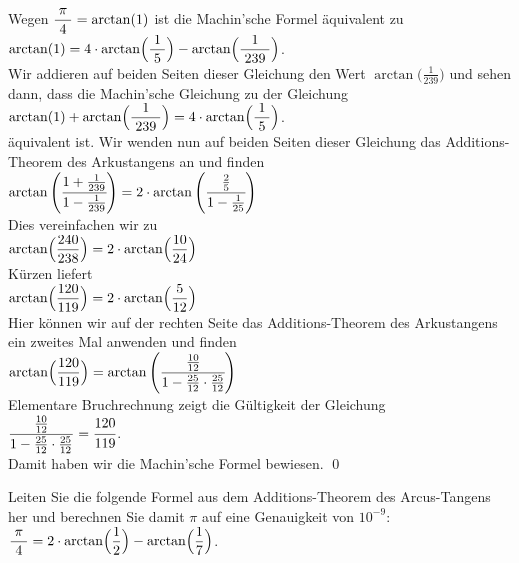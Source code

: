 \proof
Wegen $\displaystyle\frac{\;\displaystyle\pi\;}{\;\displaystyle4\;}= \arctan(1)$ ist die Machin'sche Formel \"aquivalent zu
\\[0.2cm]
\hspace*{1.3cm}
$\arctan(1) = 4 \cdot \arctan\Bigl(\displaystyle\frac{\;\displaystyle1\;}{\;\displaystyle5\;}\Bigr) - \arctan\Bigl(\displaystyle\frac{\;\displaystyle1\;}{\;\displaystyle239\;}\Bigr)$.
\\[0.2cm]
Wir addieren auf beiden Seiten dieser Gleichung den Wert $\arctan\bigl(\frac{1}{239}\bigr)$ und
sehen dann, dass die Machin'sche Gleichung zu der Gleichung
\\[0.2cm]
\hspace*{1.3cm}
$\arctan(1)+ \arctan\Bigl(\displaystyle\frac{\;\displaystyle1\;}{\;\displaystyle239\;}\Bigr) = 4 \cdot \arctan\Bigl(\displaystyle\frac{\;\displaystyle1\;}{\;\displaystyle5\;}\Bigr)$.
\\[0.2cm]
\"aquivalent ist.  Wir wenden nun auf beiden Seiten dieser Gleichung das Additions-Theorem des
Arkustangens an und finden
\\[0.2cm]
\hspace*{1.3cm}
$\arctan\left(\cfrac{1 + \frac{1}{239}}{1 - \frac{1}{239}}\right) = 
 2 \cdot \arctan\left(\cfrac{\frac{2}{5}}{1 - \frac{1}{25}}\right)
$
\\[0.2cm]
Dies vereinfachen wir zu
\\[0.2cm]
\hspace*{1.3cm}
$\displaystyle\arctan\Bigl(\frac{240}{238}\Bigr) =  2 \cdot \arctan\Bigl(\frac{10}{24}\Bigr)$
\\[0.2cm]
K\"urzen liefert
\\[0.2cm]
\hspace*{1.3cm}
$\displaystyle\arctan\Bigl(\frac{120}{119}\Bigr) =  2 \cdot \arctan\Bigl(\frac{5}{12}\Bigr)$
\\[0.2cm]
Hier k\"onnen wir auf der rechten Seite das Additions-Theorem des Arkustangens ein zweites Mal
anwenden und finden
\\[0.2cm]
\hspace*{1.3cm}
$\displaystyle\arctan\Bigl(\frac{120}{119}\Bigr) =  
 \arctan\left(\cfrac{\frac{10}{12}}{1 - \frac{25}{12}\cdot\frac{25}{12}}\right)$
\\[0.2cm]
Elementare Bruchrechnung zeigt die G\"ultigkeit der Gleichung
\\[0.2cm]
\hspace*{1.3cm}
$\dfrac{\frac{10}{12}}{1 - \frac{25}{12}\cdot\frac{25}{12}} = \cfrac{120}{119}$.
\\[0.2cm]
Damit haben wir die Machin'sche Formel bewiesen.  \qed

\exercises
Leiten Sie die folgende Formel aus dem Additions-Theorem des
Arcus-Tangens her und berechnen Sie damit $\pi$ auf eine Genauigkeit von $10^{-9}$:
\\[0.3cm]
\hspace*{1.3cm}
$\displaystyle\frac{\;\displaystyle\pi\;}{\;\displaystyle4\;} =  2 \cdot  \arctan\Bigl(\frac{1}{2}\Bigr) -\arctan\Bigl(\frac{1}{7}\Bigr) $.

